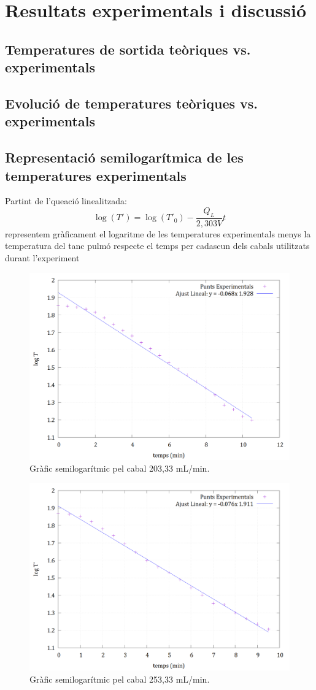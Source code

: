 \documentclass[10pt, twoside]{article}
\begin{document}
\section{Resultats experimentals i discussió}

\subsection{Temperatures de sortida teòriques vs. experimentals}

\subsection{Evolució de temperatures teòriques vs. experimentals}

\subsection{Representació semilogarítmica de les temperatures experimentals}
Partint de l'queació linealitzada: 
\begin{equation}
    \log(T') = \log(T'_0) - \frac{Q_L}{2,303V} t
\end{equation}
representem gràficament el logaritme de les temperatures experimentals menys la temperatura del tanc pulmó respecte el temps per cadascun dels cabals utilitzats durant l'experiment

\begin{figure}[H]
    \centering
    \includegraphics[width=0.7\linewidth]{ajustsemilog203.png}
    \caption{Gràfic semilogarítmic pel cabal 203,33 mL/min.}
    \label{fig2}
\end{figure}

\begin{figure}[H]
    \centering
    \includegraphics[width=0.7\linewidth]{ajustsemilog253.png}
    \caption{Gràfic semilogarítmic pel cabal 253,33 mL/min.}
    \label{fig3}
\end{figure}
\end{document}
